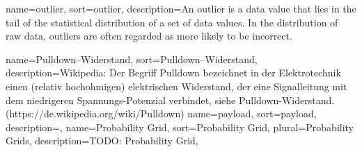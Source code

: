 
{
	name={outlier}, sort={outlier},
	description={An outlier is a data value that lies in the tail of the statistical distribution of a set of data values. In the distribution of raw data, outliers are often regarded as more likely to be incorrect.}
} %

{
	name={Pulldown--Widerstand},
	sort={Pulldown--Widerstand},
	description={Wikipedia: Der Begriff Pulldown bezeichnet in der Elektrotechnik einen (relativ hochohmigen) elektrischen Widerstand, der eine Signalleitung mit dem niedrigeren Spannungs-Potenzial verbindet, siehe Pulldown-Widerstand. (https://de.wikipedia.org/wiki/Pulldown)}
}
{
	name={payload}, sort={payload},
	description={},
}
{
	name={Probability Grid}, sort={Probability Grid}, plural={Probability Grids},
	description={TODO: Probability Grid},
}




